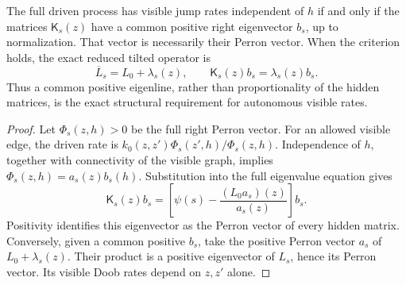 \documentclass[10pt,a4paper]{amsart}
\begin{document}
\begin{proposition} The full driven process has visible jump rates
independent of $h$ if and only if the matrices $\mathsf K_s(z)$ have
a common positive right eigenvector $b_s$, up to normalization.
That vector is necessarily their Perron vector. When the criterion
holds, the exact reduced tilted operator is
\begin{equation}
 \overline L_s=L_0+\lambda_s(z),\qquad
 \mathsf K_s(z)b_s=\lambda_s(z)b_s.
 \label{eq:common-line-reduction}
\end{equation}
Thus a common positive eigenline, rather than proportionality of
the hidden matrices, is the exact structural requirement for autonomous
visible rates.

\end{proposition}

\begin{proof} Let $\Phi_s(z,h)>0$ be the full right Perron vector.
For an allowed visible edge, the driven rate is
$k_0(z,z')\Phi_s(z',h)/\Phi_s(z,h)$. Independence of $h$, together
with connectivity of the visible graph, implies
$\Phi_s(z,h)=a_s(z)b_s(h)$. Substitution into the full eigenvalue
equation gives
\begin{equation}
 \mathsf K_s(z)b_s=
 \left[\psi(s)-\frac{(L_0a_s)(z)}{a_s(z)}\right]b_s.
\end{equation}
Positivity identifies this eigenvector as the Perron vector of every
hidden matrix. Conversely, given a common positive $b_s$, take the
positive Perron vector $a_s$ of $L_0+\lambda_s(z)$. Their product is
a positive eigenvector of $L_s$, hence its Perron vector. Its visible
Doob rates depend on $z,z'$ alone. \end{proof}
\end{document}

